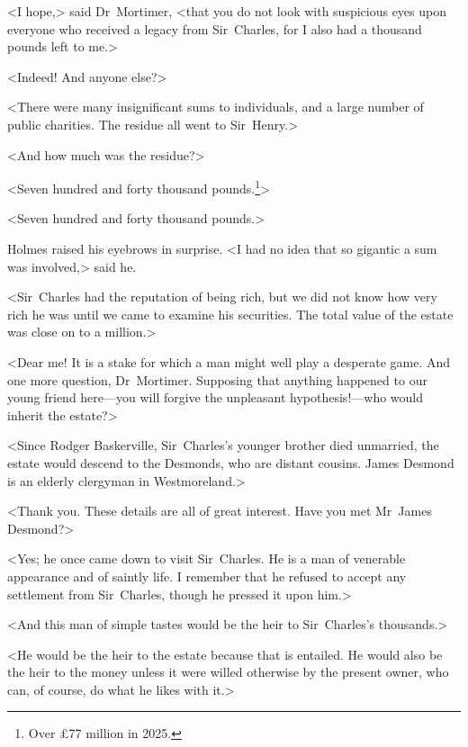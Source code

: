 \begin{withoutfootnotes}
<I hope,> said Dr~Mortimer, <that you do not look with suspicious eyes upon everyone who received a legacy from Sir~Charles, for I also had a thousand pounds left to me.>
\end{withoutfootnotes}

<Indeed! And anyone else?>

<There were many insignificant sums to individuals, and a large number of public charities. The residue all went to Sir~Henry.>

<And how much was the residue?>

\begin{withfootnotes}
<Seven hundred and forty thousand pounds.\footnote{Over \pounds 77 million in 2025.}>
\end{withfootnotes}

\begin{withoutfootnotes}
<Seven hundred and forty thousand pounds.>
\end{withoutfootnotes}

Holmes raised his eyebrows in surprise. <I had no idea that so gigantic a sum was involved,> said he.

<Sir~Charles had the reputation of being rich, but we did not know how very rich he was until we came to examine his securities. The total value of the estate was close on to a million.>

<Dear me! It is a stake for which a man might well play a desperate game. And one more question, Dr~Mortimer. Supposing that anything happened to our young friend here—you will forgive the unpleasant hypothesis!—who would inherit the estate?>

<Since Rodger Baskerville, Sir~Charles's younger brother died unmarried, the estate would descend to the Desmonds, who are distant cousins. James Desmond is an elderly clergyman in Westmoreland.>

<Thank you. These details are all of great interest. Have you met Mr~James Desmond?>

<Yes; he once came down to visit Sir~Charles. He is a man of venerable appearance and of saintly life. I remember that he refused to accept any settlement from Sir~Charles, though he pressed it upon him.>

<And this man of simple tastes would be the heir to Sir~Charles's thousands.>

<He would be the heir to the estate because that is entailed. He would also be the heir to the money unless it were willed otherwise by the present owner, who can, of course, do what he likes with it.>

